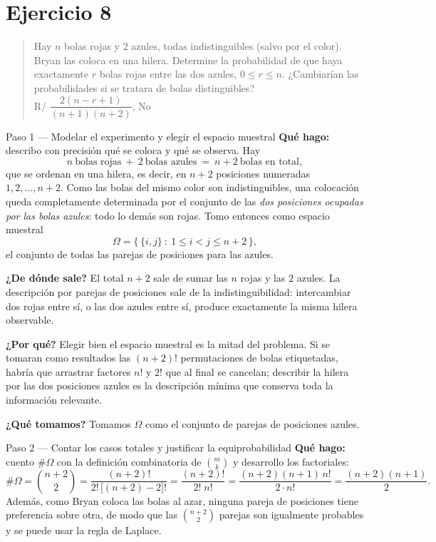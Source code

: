 \documentclass[11pt]{article}
\begin{document}
\section*{Ejercicio 8}

\begin{quote}
Hay $n$ bolas rojas y 2 azules, todas indistinguibles (salvo por el color). Bryan las coloca en una hilera. Determine la probabilidad de que haya exactamente $r$ bolas rojas entre las dos azules, $0\le r\le n$. ¿Cambiarían las probabilidades si se tratara de bolas distinguibles?\\[2pt]
\hspace*{\fill}R/ $\dfrac{2(n-r+1)}{(n+1)(n+2)}$, No
\end{quote}

\begin{sol}
\begin{paso}{Paso 1 --- Modelar el experimento y elegir el espacio muestral}
\textbf{Qué hago:} describo con precisión qué se coloca y qué se observa. Hay
\[
n\ \text{bolas rojas}\ +\ 2\ \text{bolas azules}\ =\ n+2\ \text{bolas en total},
\]
que se ordenan en una hilera, es decir, en $n+2$ posiciones numeradas
$1,2,\dots,n+2$. Como las bolas del mismo color son indistinguibles, una colocación queda
completamente determinada por el conjunto de las \emph{dos posiciones ocupadas por las bolas
azules}: todo lo demás son rojas. Tomo entonces como espacio muestral
\[
\Omega=\bigl\{\,\{i,j\}\ :\ 1\le i<j\le n+2\,\bigr\},
\]
el conjunto de todas las parejas de posiciones para las azules.

\textbf{¿De dónde sale?} El total $n+2$ sale de sumar las $n$ rojas y las $2$ azules. La
descripción por parejas de posiciones sale de la indistinguibilidad: intercambiar dos rojas
entre sí, o las dos azules entre sí, produce exactamente la misma hilera observable.

\textbf{¿Por qué?} Elegir bien el espacio muestral es la mitad del problema. Si se tomaran
como resultados las $(n+2)!$ permutaciones de bolas etiquetadas, habría que arrastrar factores
$n!$ y $2!$ que al final se cancelan; describir la hilera por las dos posiciones azules es la
descripción mínima que conserva toda la información relevante.

\textbf{¿Qué tomamos?} Tomamos $\Omega$ como el conjunto de parejas de posiciones azules.
\end{paso}

\begin{paso}{Paso 2 --- Contar los casos totales y justificar la equiprobabilidad}
\textbf{Qué hago:} cuento $\#\Omega$ con la definición combinatoria de $\binom{m}{k}$ y
desarrollo los factoriales:
\[
\#\Omega=\binom{n+2}{2}=\frac{(n+2)!}{2!\,\bigl[(n+2)-2\bigr]!}=\frac{(n+2)!}{2!\;n!}
=\frac{(n+2)(n+1)\,n!}{2\cdot n!}=\frac{(n+2)(n+1)}{2}.
\]
Además, como Bryan coloca las bolas al azar, ninguna pareja de posiciones tiene preferencia
sobre otra, de modo que las $\binom{n+2}{2}$ parejas son igualmente probables y se puede usar
la regla de Laplace.


\end{paso}
\end{sol}
\end{document}
